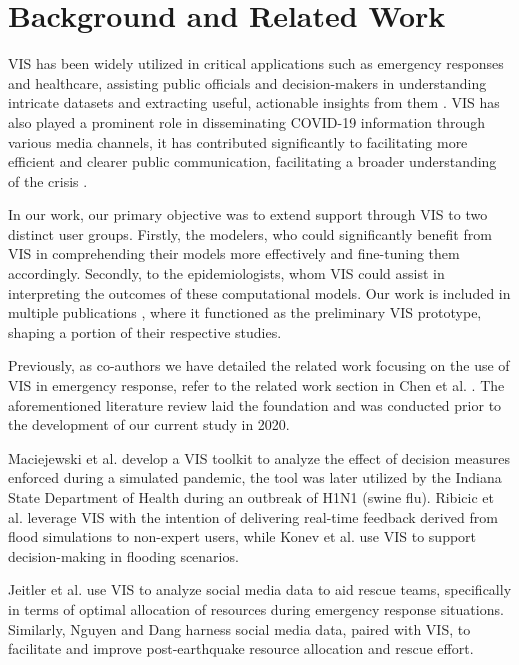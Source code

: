 \section{Background and Related Work}

\ac{VIS} has been widely utilized in critical applications such as emergency responses and healthcare, assisting public officials and decision-makers in understanding intricate datasets and extracting useful, actionable insights from them \cite{dusse2016Information}. 
\ac{VIS} has also played a prominent role in disseminating COVID-19 information through various media channels, it has contributed significantly to facilitating more efficient and clearer public communication, facilitating a broader understanding of the crisis \cite{johnshopkinsuniversityCOVID19}.

In our work, our primary objective was to extend support through \ac{VIS} to two distinct user groups. Firstly, the modelers, who could significantly benefit from VIS in comprehending their models more effectively and fine-tuning them accordingly. Secondly, to the epidemiologists, whom VIS could assist in interpreting the outcomes of these computational models. Our work is included in multiple publications \cite{chen2022RAMPVIS,dykes2022Visualizationb,khan2022Propagating,khan2022Rapid,rydow2023RAMPVIS}, where it functioned as the preliminary VIS prototype, shaping a portion of their respective studies.


Previously, as co-authors we have detailed the related work focusing on the use of \ac{VIS} in emergency response, refer to the related work section in Chen et al. \cite{chen2022RAMPVIS}. The aforementioned literature review laid the foundation and was conducted prior to the development of our current study in 2020.

Maciejewski et al. \cite{maciejewski2011Pandemica} develop a VIS toolkit to analyze the effect of decision measures enforced during a simulated pandemic, the tool was later utilized by the Indiana State Department of Health during an outbreak of H1N1 (swine flu).
Ribicic et al. \cite{ribicic2012Sketching} leverage VIS with the intention of delivering real-time feedback derived from flood simulations to non-expert users, while Konev et al. \cite{konev2014Run} use VIS to support decision-making in flooding scenarios.

Jeitler et al. \cite{jeitler2019RescueMark} use VIS to analyze social media data to aid rescue teams, specifically in terms of optimal allocation of resources during emergency response situations. Similarly, Nguyen and Dang \cite{nguyen2019EQSA} harness social media data, paired with VIS, to facilitate and improve post-earthquake resource allocation and rescue effort.


